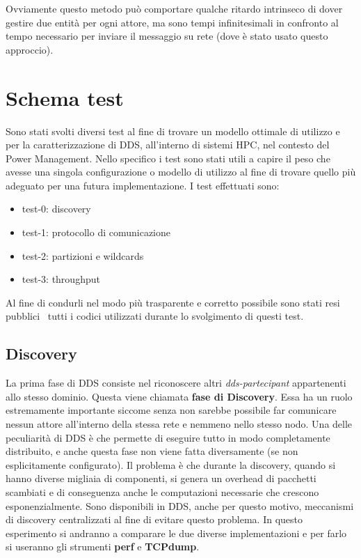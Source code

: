 Ovviamente questo metodo può comportare qualche ritardo intrinseco di dover gestire due entità per ogni attore, ma sono tempi infinitesimali in confronto al tempo necessario per inviare il messaggio su rete (dove è stato usato questo approccio).

\section{Schema test}
Sono stati svolti diversi test al fine di trovare un modello ottimale di utilizzo e per la caratterizzazione di DDS, all'interno di sistemi HPC, nel contesto del Power Management. Nello specifico i test sono stati utili a capire il peso che avesse una singola configurazione o modello di utilizzo al fine di trovare quello più adeguato per una futura implementazione. I test effettuati sono:

\begin{itemize}
    \item test-0: discovery
    \item test-1: protocollo di comunicazione
    \item test-2: partizioni e wildcards
    \item test-3: throughput
\end{itemize}


Al fine di condurli nel modo più trasparente e corretto possibile sono stati resi pubblici~\cite{mygit} tutti i codici utilizzati durante lo svolgimento di questi test. %


\subsection{Discovery}
La prima fase di DDS consiste nel riconoscere altri \emph{dds-partecipant} appartenenti allo stesso dominio. Questa viene chiamata \textbf{fase di Discovery}. Essa ha un ruolo estremamente importante siccome senza non sarebbe possibile far comunicare nessun attore all'interno della stessa rete e nemmeno nello stesso nodo. Una delle peculiarità di DDS è che permette di eseguire tutto in modo completamente distribuito, e anche questa fase non viene fatta diversamente (se non esplicitamente configurato). Il problema è che durante la discovery, quando si hanno diverse migliaia di componenti, si genera un overhead di pacchetti scambiati e di conseguenza anche le computazioni necessarie che crescono esponenzialmente. %
Sono disponibili in DDS, anche per questo motivo, meccanismi di discovery centralizzati al fine di evitare questo problema. In questo esperimento si andranno a comparare le due diverse implementazioni e per farlo si useranno gli strumenti \textbf{perf} e \textbf{TCPdump}.

